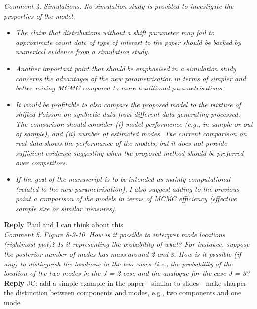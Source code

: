 \documentclass[12pt]{article}
\begin{document}
\textit{Comment 4. Simulations. No simulation study is provided to investigate the properties of the model.}
\begin{itemize}
\item[a)] \textit{The claim that distributions without a shift parameter may fail to approximate count data of type of interest to the paper should be backed by numerical evidence from a simulation study.}


\item[b] \textit{Another important point that should be emphasised in a simulation study concerns the advantages of the new parametrisation in terms of simpler and better mixing MCMC compared to more traditional parametrisations.}


\item[c] \textit{It would be profitable to also compare the proposed model to the mixture of shifted Poisson on synthetic data from different data generating processed. The comparison should consider (i) model performance (e.g., in sample or out of sample), and (ii) number of estimated modes. The current comparison on real data shows the performance of the models, but it does not provide sufficient evidence suggesting when the proposed method should be preferred over competitors.}


\item[d] \textit{If the goal of the manuscript is to be intended as mainly computational (related to the new parametrisation), I also suggest adding to the previous point a comparison of the models in terms of MCMC efficiency (effective sample size or similar measures).}


\end{itemize}


\textbf{Reply} Paul and I can think about this\\


\textit{Comment 5. Figure 8-9-10. How is it possible to interpret mode locations (rightmost plot)? Is it representing
the probability of what? For instance, suppose the posterior number of modes has mass around 2 and 3. How is it possible
(if any) to distinguish the locations in the two cases (i.e., the probability of the location
of the two modes in the J = 2 case and the analogue for the case J = 3?}\\

\textbf{Reply} JC: add a simple example in the paper - similar to slides - make sharper the distinction between components and modes, e.g., two components and one mode\\
\end{document}
